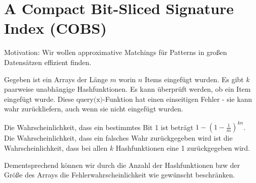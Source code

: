 \chapter{A Compact Bit-Sliced Signature Index (COBS)}

Motivation: Wir wollen approximative Matchings für Patterns in großen Datensätzen effizient finden.

Gegeben ist ein Arrays der Länge $m$ worin $n$ Items eingefügt wurden. Es gibt $k$ paarweise unabhängige Hashfunktionen. 
Es kann überprüft werden, ob ein Item eingefügt wurde. Diese $\text{query(x)}$-Funktion hat einen einseitigen Fehler - sie kann wahr zurückliefern, auch wenn sie nicht eingefügt wurden.  

Die Wahrscheinlichkeit, dass ein bestimmtes Bit 1 ist beträgt $1-(1-\frac{1}{m})^{kn}$. Die Wahrscheinlichkeit, dass ein falsches Wahr zurückgegeben wird ist die Wahrscheinlichkeit, dass bei allen $k$ Hashfunktionen eine 1 zurückgegeben wird. 

Dementsprechend können wir durch die Anzahl der Hashfunktionen bzw der Größe des Arrays die Fehlerwahrscheinlichkeit wie gewünscht beschränken.